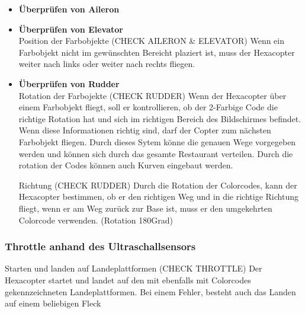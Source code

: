       \begin{itemize}

        \item \textbf{Überprüfen von Aileron}\\




        \item \textbf{Überprüfen von Elevator}\\

        Position der Farbobjekte (CHECK AILERON \& ELEVATOR)
        Wenn ein Farbobjekt nicht im gewünschten Bereicht plaziert ist, muss der Hexacopter weiter nach links oder weiter nach rechts fliegen.

        \item \textbf{Überprüfen von Rudder}\\

        Rotation der Farbojekte (CHECK RUDDER)
        Wenn der Hexacopter über einem Farbobjekt fliegt, soll er kontrollieren, ob der 2-Farbige Code die richtige Rotation hat und sich im richtigen Bereich des Bildschirmes befindet. Wenn diese Informationen richtig sind, darf der Copter zum nächsten Farbobjekt fliegen.
        Durch dieses Sytem könne die genauen Wege vorgegeben werden und können sich durch das gesamte Restaurant verteilen. Durch die rotation der Codes können auch Kurven eingebaut werden.



        Richtung (CHECK RUDDER)
        Durch die Rotation der Colorcodes, kann der Hexacopter bestimmen, ob er den richtigen Weg und in die richtige Richtung fliegt, wenn er am Weg zurück zur Base ist, muss er den umgekehrten Colorcode verwenden. (Rotation 180Grad)





      \end{itemize}









    \subsubsection{Throttle anhand des Ultraschallsensors}

    Starten und landen auf Landeplattformen (CHECK THROTTLE)
    Der Hexacopter startet und landet auf den mit ebenfalls mit Colorcodes gekennzeichneten Landeplattformen.
    Bei einem Fehler, besteht auch das Landen auf einem beliebigen Fleck

